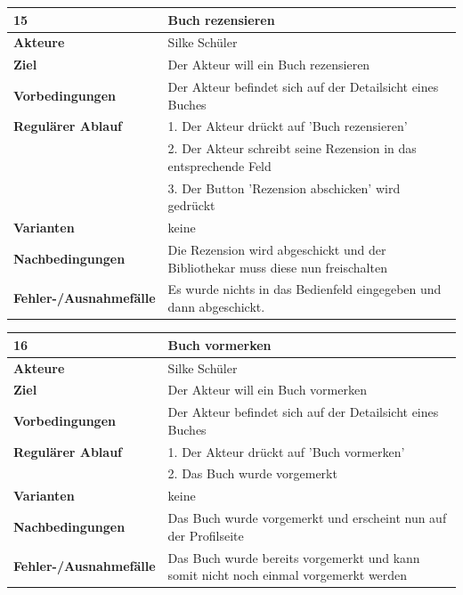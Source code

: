 \documentclass[fontsize=12pt,paper=a4,twoside]{scrartcl}
\begin{document}
\begin{table}[htbp]
\label{15}
\begin{tabular}{|l|p{10cm}|}
\hline 
\textbf{15} & \textbf{Buch rezensieren} \\ \hline
\textbf{Akteure} & Silke Schüler\\ \hline
\textbf{Ziel} & Der Akteur will ein Buch rezensieren \\ \hline
\textbf{Vorbedingungen} & Der Akteur befindet sich auf der Detailsicht eines Buches \\ \hline
\textbf{Regulärer Ablauf} & 
1. Der Akteur drückt auf 'Buch rezensieren' \\
&2. Der Akteur schreibt seine Rezension in das entsprechende Feld\\
&3. Der Button 'Rezension abschicken' wird gedrückt\\
\hline
\textbf{Varianten} & 
keine \\ \hline
\textbf{Nachbedingungen} & Die Rezension wird abgeschickt und der Bibliothekar muss diese nun freischalten\\ \hline
\textbf{Fehler-/Ausnahmefälle} & Es wurde nichts in das Bedienfeld eingegeben und dann abgeschickt.\\
\hline
\end{tabular}
\end{table}

\begin{table}[htbp]
\label{16}
\begin{tabular}{|l|p{10cm}|}
\hline 
\textbf{16} & \textbf{Buch vormerken} \\ \hline
\textbf{Akteure} & Silke Schüler\\ \hline
\textbf{Ziel} & Der Akteur will ein Buch vormerken \\ \hline
\textbf{Vorbedingungen} & Der Akteur befindet sich auf der Detailsicht eines Buches \\ \hline
\textbf{Regulärer Ablauf} & 
1. Der Akteur drückt auf 'Buch vormerken' \\
&2. Das Buch wurde vorgemerkt\\
\hline
\textbf{Varianten} & 
keine \\ \hline
\textbf{Nachbedingungen} & Das Buch wurde vorgemerkt und erscheint nun auf der Profilseite\\ \hline
\textbf{Fehler-/Ausnahmefälle} & Das Buch wurde bereits vorgemerkt und kann somit nicht noch einmal vorgemerkt werden\\
\hline
\end{tabular}
\end{table}
\end{document}
